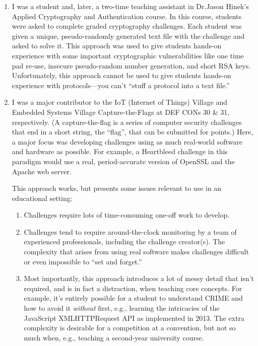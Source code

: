 \documentclass[12pt]{article}
\begin{document}

\begin{enumerate}
  \item I was a student and, later, a two-time teaching assistant in Dr.\@ Jason Hinek's Applied Cryptography and Authentication course. In this course, students were asked to complete graded cryptography challenges. Each student was given a unique, pseudo-randomly generated text file with the challenge and asked to solve it. This approach was used to give students hands-on experience with some important cryptographic vulnerabilities like one time pad re-use, insecure pseudo-random number generation, and short RSA keys. Unfortunately, this approach cannot be used to give students hands-on experience with protocols---you can't ``stuff a protocol into a text file.''
  \item I was a major contributor to the IoT (Internet of Things) Village and Embedded Systems Village Capture-the-Flags at DEF CONs 30 \& 31, respectively. (A capture-the-flag is a series of computer security challenges that end in a short string, the ``flag'', that can be submitted for points.) Here, a major focus was developing challenges using as much real-world software and hardware as possible. For example, a Heartbleed challenge in this paradigm would use a real, period-accurate version of OpenSSL and the Apache web server.
      
      This approach works, but presents some issues relevant to use in an educational setting:
      \begin{enumerate}
        \item Challenges require lots of time-consuming one-off work to develop.
        \item Challenges tend to require around-the-clock monitoring by a team of experienced professionals, including the challenge creator(s). The complexity that arises from using real software makes challenges difficult or even impossible to ``set and forget.''
        \item Most importantly, this approach introduces a lot of messy detail that isn't required, and is in fact a distraction, when teaching core concepts. For example, it's entirely possible for a student to understand CRIME and how to avoid it \textit{without} first, e.g.,  learning the intricacies of the JavaScript XMLHTTPRequest API as implemented in 2013. The extra complexity is desirable for a competition at a convention, but not so much when, e.g., teaching a second-year university course.
      \end{enumerate}
\end{enumerate}
\end{document}
